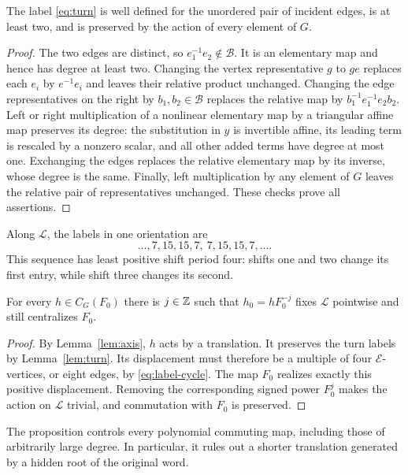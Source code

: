 \begin{lemma}\label{lem:turn}
The label \eqref{eq:turn} is well defined for the unordered pair of
incident edges, is at least two, and is preserved by the action of
every element of $G$.
\end{lemma}

\begin{proof}
The two edges are distinct, so $e_1^{-1}e_2\notin\mathcal B$.
It is an elementary map and hence has degree at least two.
Changing the vertex representative $g$ to $ge$ replaces each
$e_i$ by $e^{-1}e_i$ and leaves their relative product unchanged.
Changing the edge representatives on the right by $b_1,b_2\in
\mathcal B$ replaces the relative map by
$b_1^{-1}e_1^{-1}e_2b_2$.
Left or right multiplication of a nonlinear elementary map by a
triangular affine map preserves its degree: the substitution in
$y$ is invertible affine, its leading term is rescaled by a nonzero
scalar, and all other added terms have degree at most one.
Exchanging the edges replaces the relative elementary map by its
inverse, whose degree is the same. Finally, left multiplication
by any element of $G$ leaves the relative pair of representatives
unchanged. These checks prove all assertions.
\end{proof}

Along $\mathcal L$, the labels in one orientation are
\begin{equation}\label{eq:label-cycle}
  \ldots,7,15,15,7,\ 7,15,15,7,\ldots.
\end{equation}
This sequence has least positive shift period four: shifts one and
two change its first entry, while shift three changes its second.

\begin{proposition}\label{prop:primitive-translation}
For every $h\in C_G(F_0)$ there is $j\in\mathbb Z$ such that
$h_0=hF_0^{-j}$ fixes $\mathcal L$ pointwise and still centralizes
$F_0$.
\end{proposition}

\begin{proof}
By Lemma~\ref{lem:axis}, $h$ acts by a translation. It preserves
the turn labels by Lemma~\ref{lem:turn}. Its displacement must
therefore be a multiple of four $\mathcal E$-vertices, or eight
edges, by \eqref{eq:label-cycle}. The map $F_0$ realizes exactly
this positive displacement. Removing the corresponding signed
power $F_0^j$ makes the action on $\mathcal L$ trivial, and
commutation with $F_0$ is preserved.
\end{proof}

The proposition controls every polynomial commuting map, including
those of arbitrarily large degree. In particular, it rules out a
shorter translation generated by a hidden root of the original word.

